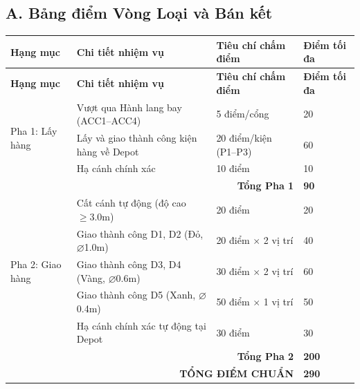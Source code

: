 \documentclass[12pt,a4paper]{article}
\begin{document}
\subsection*{A. Bảng điểm Vòng Loại và Bán kết}
\begin{longtable}{p{3.0cm}p{6.0cm}p{3.8cm}p{1.6cm}}
\toprule
\textbf{Hạng mục} & \textbf{Chi tiết nhiệm vụ} & \textbf{Tiêu chí chấm điểm} & \textbf{Điểm tối đa} \\
\midrule
\endfirsthead
\toprule
\textbf{Hạng mục} & \textbf{Chi tiết nhiệm vụ} & \textbf{Tiêu chí chấm điểm} & \textbf{Điểm tối đa} \\
\midrule
\endhead
\multirow{3}{3.0cm}{Pha 1: Lấy hàng} & Vượt qua Hành lang bay (ACC1–ACC4) & 5 điểm/cổng & 20 \\
 & Lấy và giao thành công kiện hàng về Depot & 20 điểm/kiện (P1–P3) & 60 \\
 & Hạ cánh chính xác & 10 điểm & 10 \\
\midrule
\multicolumn{3}{r}{\textbf{Tổng Pha 1}} & \textbf{90} \\
\midrule
\multirow{5}{3.0cm}{Pha 2: Giao hàng} & Cất cánh tự động (độ cao $\geq 3.0$m) & 20 điểm & 20 \\
 & Giao thành công D1, D2 (Đỏ, $\varnothing$1.0m) & 20 điểm $\times$ 2 vị trí & 40 \\
 & Giao thành công D3, D4 (Vàng, $\varnothing$0.6m) & 30 điểm $\times$ 2 vị trí & 60 \\
 & Giao thành công D5 (Xanh, $\varnothing$0.4m) & 50 điểm $\times$ 1 vị trí & 50 \\
 & Hạ cánh chính xác tự động tại Depot & 30 điểm & 30 \\
\midrule
\multicolumn{3}{r}{\textbf{Tổng Pha 2}} & \textbf{200} \\
\midrule
\multicolumn{3}{r}{\textbf{TỔNG ĐIỂM CHUẨN}} & \textbf{290} \\
\bottomrule
\end{longtable}
\end{document}
